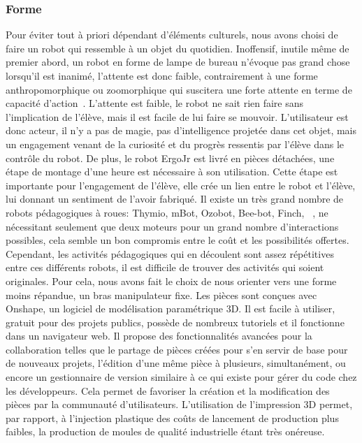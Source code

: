         \subsubsection{Forme}
            Pour éviter tout à priori dépendant d'éléments culturels, nous avons choisi de faire un robot qui ressemble à un objet du quotidien. Inoffensif, inutile même de premier abord, un robot en forme de lampe de bureau n'évoque pas grand chose lorsqu'il est inanimé, l'attente est donc faible, contrairement à une forme anthropomorphique ou zoomorphique qui suscitera une forte attente en terme de capacité d'action~.
            L'attente est faible, le robot ne sait rien faire sans l'implication de l'élève, mais il est facile de lui faire se mouvoir. L'utilisateur est donc acteur, il n'y a pas de magie, pas d'intelligence projetée dans cet objet, mais un engagement venant de la curiosité et du progrès ressentis par l'élève dans le contrôle du robot.
            De plus, le robot ErgoJr est livré en pièces détachées, une étape de montage d'une heure est nécessaire à son utilisation. Cette étape est importante pour l'engagement de l'élève, elle crée un lien entre le robot et l'élève, lui donnant un sentiment de l'avoir fabriqué.
            Il existe un très grand nombre de robots pédagogiques à roues: Thymio, mBot, Ozobot, Bee-bot, Finch, \etc~, ne nécessitant seulement que deux moteurs pour un grand nombre d'interactions possibles, cela semble un bon compromis entre le coût et les possibilités offertes. Cependant, les activités pédagogiques  qui en découlent sont assez répétitives entre ces différents robots, il est difficile de trouver des activités qui soient originales. Pour cela, nous avons fait le choix de nous orienter vers une forme moins répandue, un bras manipulateur fixe.
            Les pièces sont conçues avec Onshape, un logiciel de modélisation paramétrique 3D. Il est facile à utiliser, gratuit pour des projets publics, possède de nombreux tutoriels et il fonctionne dans un navigateur web.
            Il propose des fonctionnalités avancées pour la collaboration telles que le partage de pièces créées pour s'en servir de base pour de nouveaux projets, l'édition d'une même pièce à plusieurs, simultanément, ou encore un gestionnaire de version similaire à ce qui existe pour gérer du code chez les développeurs.
            Cela permet de favoriser la création et la modification des pièces par la communauté d'utilisateurs.
            L'utilisation de l'impression 3D permet, par rapport, à l'injection plastique des coûts de lancement de production plus faibles, la production de moules de qualité industrielle étant très onéreuse.
